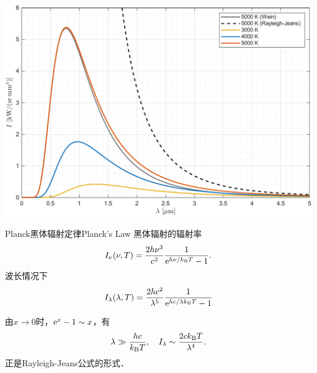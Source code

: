 \begin{center}
	\includegraphics[width=0.8\linewidth]{graphs/blackbody.pdf}
	\label{fig:blackbody radiation}
\end{center}

\begin{theorem}{Planck黑体辐射定律}{Planck's Law}
	黑体辐射的辐射率
	\begin{align}
		I_\nu(\nu,T)=\frac{2h\nu^3}{c^2}\frac{1}{\mathop{}\!\mathrm{e}^{h\nu/k_{\mathrm B} T}-1}.
	\end{align}
	波长情况下
	\begin{align}
		I_\lambda(\lambda,T)=\frac{2hc^2}{\lambda^5}\frac{1}{\mathop{}\!\mathrm{e}^{hc/\lambda k_{\mathrm B} T}-1}
	\end{align}
\end{theorem}
由$x\to0$时，$\mathop{}\!\mathrm{e}^ x-1\sim x$，有
\[
	\lambda\gg\frac{hc}{k_{\mathrm B} T},\quad I_\lambda\sim\frac{2ck_{\mathrm B} T}{\lambda^4}.
\]
正是Rayleigh-Jeans公式的形式．

